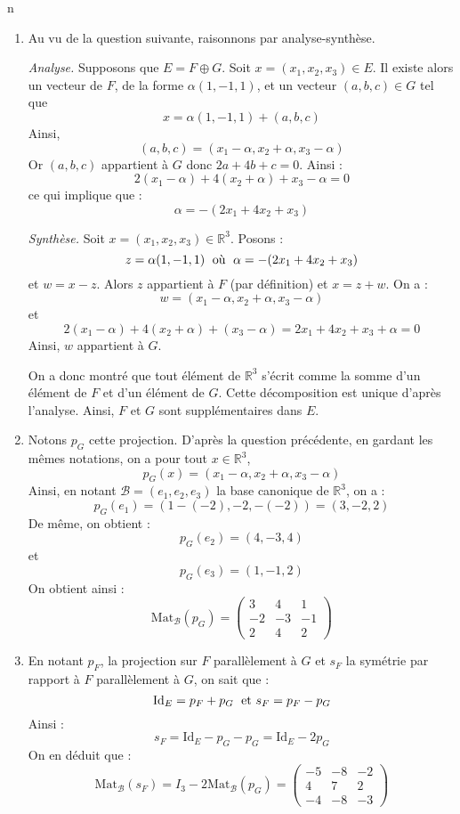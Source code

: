 n\documentclass[a4paper,10pt]{report}
\begin{document}
\begin{enumerate}
\item Au vu de la question suivante, raisonnons par analyse-synthèse.

\medskip

\noindent \textit{Analyse.} Supposons que $E = F \oplus G$. Soit $x=(x_1,x_2,x_3) \in E$. Il existe alors un vecteur de $F$, de la forme $\alpha (1,-1,1)$, et un vecteur $(a,b,c) \in G$ tel que 
$$x = \alpha (1,-1,1) + (a,b,c)$$
Ainsi,
$$ (a,b,c) = (x_1 - \alpha, x_2+\alpha, x_3- \alpha)$$
Or $(a,b,c)$ appartient à $G$ donc $2a+4b+c=0$. Ainsi :
$$ 2(x_1 -\alpha) + 4 (x_2+ \alpha) + x_3- \alpha = 0$$
ce qui implique que :
$$ \alpha = - (2x_1+4x_2+x_3)$$

\medskip

\noindent \textit{Synthèse.} Soit $x=(x_1,x_2,x_3) \in \mathbb{R}^3$. Posons :
$$ z = \alpha (1,-1,1) \; \hbox{ où } \; \alpha = - (2x_1+4x_2+x_3)$$
et $w=x-z$. Alors $z$ appartient à $F$ (par définition) et $x=z+w$. On a :
$$ w = (x_1- \alpha, x_2+ \alpha, x_3- \alpha)$$
et 
$$ 2(x_1 - \alpha) + 4(x_2+ \alpha) + (x_3-\alpha) = 2x_1+4x_2+x_3 + \alpha = 0$$
Ainsi, $w$ appartient à $G$.

\medskip

\noindent On a donc montré que tout élément de $\mathbb{R}^3$ s'écrit comme la somme d'un élément de $F$ et d'un élément de $G$. Cette décomposition est unique d'après l'analyse. Ainsi, $F$ et $G$ sont supplémentaires dans $E$.
\item Notons $p_G$ cette projection. D'après la question précédente, en gardant les mêmes notations, on a pour tout $x \in \mathbb{R}^3$,
$$ p_G(x) = (x_1- \alpha, x_2+ \alpha, x_3- \alpha)$$
Ainsi, en notant $\mathcal{B}=(e_1,e_2,e_3)$ la base canonique de $\mathbb{R}^3$, on a :
$$ p_G(e_1) =(1 - (-2), -2, -(-2)) = (3,-2,2) $$
De même, on obtient :
$$ p_G(e_2) = (4,-3, 4) $$
et 
$$ p_G(e_3) = (1, -1, 2) $$
On obtient ainsi :
$$ \textrm{Mat}_{\mathcal{B}}(p_G) =  \begin{pmatrix}
3 & 4& 1 \\
-2& -3 & -1 \\
2 & 4 & 2
\end{pmatrix}$$
\item En notant $p_F$, la projection sur $F$ parallèlement à $G$ et $s_F$ la symétrie par rapport à $F$ parallèlement à $G$, on sait que :
$$ \textrm{Id}_E = p_F+p_G \; \hbox{ et } s_F = p_F-p_G$$
Ainsi :
$$ s_F = \textrm{Id}_E- p_G-p_G = \textrm{Id}_E - 2p_G$$
On en déduit que :
$$ \textrm{Mat}_{\mathcal{B}}(s_F) = I_3 - 2 \textrm{Mat}_{\mathcal{B}}(p_G) =  \begin{pmatrix}
-5 & -8& -2 \\
4& 7 & 2 \\
-4 & -8 & -3
\end{pmatrix}$$
\end{enumerate}
\end{document}
